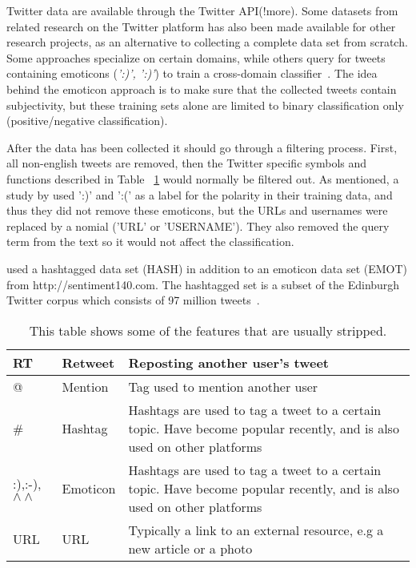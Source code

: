 Twitter data are available through the Twitter API(!more). Some datasets from related research on the Twitter platform has also been made available for other research projects, as an alternative to collecting a complete data set from scratch. Some approaches specialize on certain domains, while others query for tweets containing emoticons (\emph{':)', ':)'}) to train a cross-domain classifier~\citep{article:go}. The idea behind the emoticon approach is to make sure that the collected tweets contain subjectivity, but these training sets alone are limited to binary classification only (positive/negative classification).

After the data has been collected it should go through a filtering process. First, all non-english tweets are removed, then the Twitter specific symbols and functions described in Table ~\ref{tab:features} would normally be filtered out. As mentioned, a study by \cite{article:go} used ':)' and ':(' as a label for the polarity in their training data, and thus they did not remove these emoticons, but the URLs and usernames were replaced by a nomial ('URL' or 'USERNAME'). They also removed the query term from the text so it would not affect the classification.

\cite{article:omg} used a hashtagged data set (HASH) in addition to an emoticon data set (EMOT) from http://sentiment140.com. The hashtagged set is a subset of the Edinburgh Twitter corpus which consists of 97 million tweets~\citep{article:edinburgh}.

\begin{table}[]
\centering
\label{tab:features}
\begin{tabular}{|l|l|p{8cm}|}
\hline
RT & Retweet & Reposting another user’s tweet \\ \hline
@ & Mention & Tag used to mention another user \\ \hline
\# & Hashtag & Hashtags are used to tag a tweet to a certain topic. Have become popular recently, and is also used on other platforms \\ \hline
:),:-),$\wedge\wedge$ & Emoticon & Hashtags are used to tag a tweet to a certain topic. Have become popular recently, and is also used on other platforms \\ \hline
URL & URL & Typically a link to an external resource, e.g a new article or a photo \\ \hline
\end{tabular}
\caption{This table shows some of the features that are usually stripped.}
\end{table}

